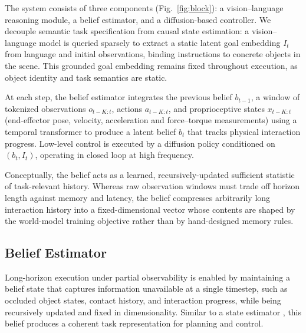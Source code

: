 \documentclass[12pt]{article}
\begin{document}
The system consists of three components (Fig.~\ref{fig:block}): a vision--language reasoning module, a belief estimator, and a diffusion-based controller. We decouple semantic task specification from causal state estimation: a vision--language model is queried sparsely to extract a static latent goal embedding $I_t$ from language and initial observations, binding instructions to concrete objects in the scene. This grounded goal embedding remains fixed throughout execution, as object identity and task semantics are static.

At each step, the belief estimator integrates the previous belief $b_{t-1}$, a window of tokenized observations $o_{t-K:t}$, actions $a_{t-K:t}$, and proprioceptive states $x_{t-K:t}$ (end-effector pose, velocity, acceleration and force--torque measurements) using a temporal transformer to produce a latent belief $b_t$ that tracks physical interaction progress. Low-level control is executed by a diffusion policy conditioned on $(b_t, I_t)$, operating in closed loop at high frequency.

Conceptually, the belief acts as a learned, recursively-updated sufficient statistic of task-relevant history. Whereas raw observation windows must trade off horizon length against memory and latency, the belief compresses arbitrarily long interaction history into a fixed-dimensional vector whose contents are shaped by the world-model training objective rather than by hand-designed memory rules.

\subsection{Belief Estimator}
\label{subsec:belief}
Long-horizon execution under partial observability is enabled by maintaining a belief state that captures information unavailable at a single timestep, such as occluded object states, contact history, and interaction progress, while being recursively updated and fixed in dimensionality. Similar to a state estimator \cite{chen2003bayesian}, this belief produces a coherent task representation for planning and control.
\end{document}
